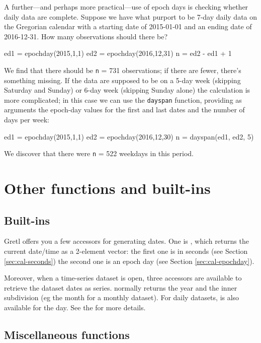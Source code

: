A further---and perhaps more practical---use of epoch days is checking
whether daily data are complete. Suppose we have what purport to be
7-day daily data on the Gregorian calendar with a starting date of
2015-01-01 and an ending date of 2016-12-31. How many observations
should there be?
%
\begin{code}
ed1 = epochday(2015,1,1)
ed2 = epochday(2016,12,31)
n = ed2 - ed1 + 1
\end{code}
We find that there should be \texttt{n} = 731 observations; if there
are fewer, there's something missing. If the data are supposed to be
on a 5-day week (skipping Saturday and Sunday) or 6-day week (skipping
Sunday alone) the calculation is more complicated; in this case we can
use the \texttt{dayspan} function, providing as arguments the
epoch-day values for the first and last dates and the number of days
per week:
\begin{code}
ed1 = epochday(2015,1,1)
ed2 = epochday(2016,12,30)
n = dayspan(ed1, ed2, 5)
\end{code}
%
We discover that there were \texttt{n} = 522 weekdays in this period.

\section{Other functions and built-ins}
\label{sec:cal-otherfuncs}

\subsection{Built-ins}
\label{sec:cal-builtins}

Gretl offers you a few accessors for generating dates. One is
, which returns the current date/time as a 2-element
vector: the first one is in seconds (see Section
\ref{sec:cal-seconds}) the second one is an epoch day (see Section
\ref{sec:cal-epochday}).

Moreover, when a time-series dataset is open, three accessors are
available to retrieve the dataset dates as series. 
normally returns the year and  the inner subdivision
(eg the month for a monthly dataset). For daily datasets,
 is also available for the day. See the \GCR{} for
more details.

\subsection{Miscellaneous functions}
\label{sec:cal-misc}

